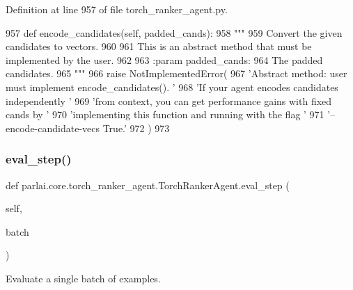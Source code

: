 Definition at line 957 of file torch\+\_\+ranker\+\_\+agent.\+py.


\begin{DoxyCode}
957     \textcolor{keyword}{def }encode\_candidates(self, padded\_cands):
958         \textcolor{stringliteral}{"""}
959 \textcolor{stringliteral}{        Convert the given candidates to vectors.}
960 \textcolor{stringliteral}{}
961 \textcolor{stringliteral}{        This is an abstract method that must be implemented by the user.}
962 \textcolor{stringliteral}{}
963 \textcolor{stringliteral}{        :param padded\_cands:}
964 \textcolor{stringliteral}{            The padded candidates.}
965 \textcolor{stringliteral}{        """}
966         \textcolor{keywordflow}{raise} NotImplementedError(
967             \textcolor{stringliteral}{'Abstract method: user must implement encode\_candidates(). '}
968             \textcolor{stringliteral}{'If your agent encodes candidates independently '}
969             \textcolor{stringliteral}{'from context, you can get performance gains with fixed cands by '}
970             \textcolor{stringliteral}{'implementing this function and running with the flag '}
971             \textcolor{stringliteral}{'--encode-candidate-vecs True.'}
972         )
973 
\end{DoxyCode}
\mbox{\label{classparlai_1_1core_1_1torch__ranker__agent_1_1TorchRankerAgent_a65bca7841123e4c3df1e09f8c4eb397f}} 
\subsubsection{\texorpdfstring{eval\+\_\+step()}{eval\_step()}}
{\footnotesize\ttfamily def parlai.\+core.\+torch\+\_\+ranker\+\_\+agent.\+Torch\+Ranker\+Agent.\+eval\+\_\+step (\begin{DoxyParamCaption}\item[{}]{self,  }\item[{}]{batch }\end{DoxyParamCaption})}

\begin{DoxyVerb}Evaluate a single batch of examples.
\end{DoxyVerb}
 

